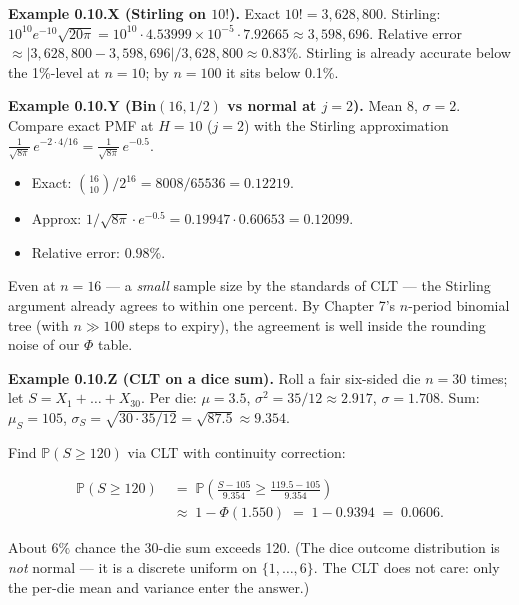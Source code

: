 \documentclass[
  10pt,
  twoside]{book}
\providecommand{\tightlist}{%
  \setlength{\itemsep}{0pt}\setlength{\parskip}{0pt}}
\begin{document}
\textbf{Example 0.10.X (Stirling on \(10!\)).} Exact
\(10! = 3{,}628{,}800\). Stirling:
\(10^{10} e^{-10} \sqrt{20\pi} = 10^{10} \cdot 4.53999 \times 10^{-5} \cdot 7.92665 \approx 3{,}598{,}696\).
Relative error
\(\approx |3{,}628{,}800 - 3{,}598{,}696| / 3{,}628{,}800 \approx 0.83\%\).
Stirling is already accurate below the 1\%-level at \(n = 10\); by
\(n = 100\) it sits below 0.1\%.

\textbf{Example 0.10.Y (Bin\((16, 1/2)\) vs normal at \(j = 2\)).} Mean
\(8\), \(\sigma = 2\). Compare exact PMF at \(H = 10\) (\(j = 2\)) with
the Stirling approximation
\(\frac{1}{\sqrt{8\pi}}\,e^{-2 \cdot 4/16} = \frac{1}{\sqrt{8\pi}}\,e^{-0.5}\).

\begin{itemize}
\tightlist
\item
  Exact: \(\binom{16}{10}/2^{16} = 8008/65536 = 0.12219\).
\item
  Approx:
  \(1/\sqrt{8\pi} \cdot e^{-0.5} = 0.19947 \cdot 0.60653 = 0.12099\).
\item
  Relative error: \(0.98\%\).
\end{itemize}

Even at \(n = 16\) --- a \emph{small} sample size by the standards of
CLT --- the Stirling argument already agrees to within one percent. By
Chapter 7's \(n\)-period binomial tree (with \(n \gg 100\) steps to
expiry), the agreement is well inside the rounding noise of our \(\Phi\)
table.

\textbf{Example 0.10.Z (CLT on a dice sum).} Roll a fair six-sided die
\(n = 30\) times; let \(S = X_1 + \dots + X_{30}\). Per die:
\(\mu = 3.5\), \(\sigma^2 = 35/12 \approx 2.917\), \(\sigma = 1.708\).
Sum: \(\mu_S = 105\),
\(\sigma_S = \sqrt{30 \cdot 35/12} = \sqrt{87.5} \approx 9.354\).

Find \(\mathbb{P}(S \geq 120)\) via CLT with continuity correction:

\[
\begin{aligned}
\mathbb{P}(S \geq 120)
&\;=\; \mathbb{P}\!\left(\frac{S - 105}{9.354} \geq \frac{119.5 - 105}{9.354}\right) \\
&\;\approx\; 1 - \Phi(1.550) \;=\; 1 - 0.9394 \;=\; 0.0606.
\end{aligned}
\]

About \(6\%\) chance the 30-die sum exceeds 120. (The dice outcome
distribution is \emph{not} normal --- it is a discrete uniform on
\(\{1, \dots, 6\}\). The CLT does not care: only the per-die mean and
variance enter the answer.)
\end{document}
